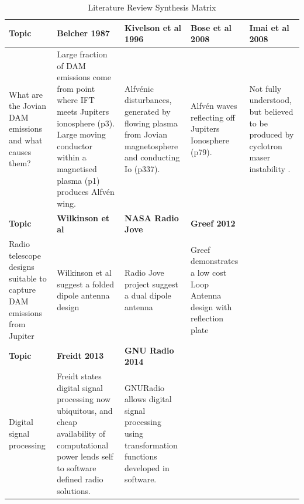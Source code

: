 \documentclass[runningheads,a4paper]{llncs}
\begin{document}
%
\begin{table}
  \centering
  \begin{tabular}{ | p{2.5cm} || p{2.5cm} | p{2.5cm} | p{2.5cm} | p{2.5cm} |}
    \hline
    \textbf{Topic} & \textbf{Belcher 1987} & \textbf{Kivelson et al 1996} & \textbf{Bose et al 2008} & \textbf{Imai et al 2008} \\ \hline \hline
    What are the Jovian DAM emissions and what causes them? & Large fraction of DAM emissions come from point where IFT meets Jupiters ionosphere (p3). Large moving conductor within a magnetised plasma (p1) produces Alfv\'en wing. & Alfv\'enic disturbances, generated by flowing plasma from Jovian magnetosphere and conducting Io (p337). & Alfv\'en waves reflecting off Jupiters Ionosphere (p79). & Not fully understood, but believed to be produced by cyclotron maser instability \citep{imai-08}. \\ \hline \hline

    \textbf{Topic} & \textbf{Wilkinson et al} & \textbf{NASA Radio Jove} & \textbf{Greef 2012} &  \\ \hline \hline

    Radio telescope designs suitable to capture DAM emissions from Jupiter & Wilkinson et al suggest a folded dipole antenna design & Radio Jove project suggest a dual dipole antenna & Greef demonstrates a low cost Loop Antenna design with reflection plate & \\ \hline \hline
    
    \textbf{Topic} & \textbf{Freidt 2013} & \textbf{GNU Radio 2014} & & \\ \hline \hline    
    
    Digital signal processing & Freidt states digital signal processing now ubiquitous, and cheap availability of computational power lends self to software defined radio solutions. & GNURadio allows digital signal processing using transformation functions developed in software. & &  \\ 
    

    
    \hline
  \end{tabular}
  \caption{Literature Review Synthesis Matrix}
  \label{tab:literature_review_synthesis_matrix}
\end{table}
%



%
%
\end{document}
